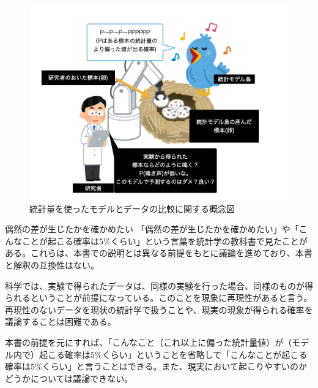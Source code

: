 \begin{figure}
    \begin{center}
        \includegraphics[bb=0 0 1024 768,width=15cm]{./image/01_/conceptual_diagram/conceptual_diagram.003.png}
        \caption{統計量を使ったモデルとデータの比較に関する概念図}
        \label{fig:conceptual_diagram_test}
    \end{center}
\end{figure}
    


\begin{SMbox}{偶然の差が生じたかを確かめたい}
    「偶然の差が生じたかを確かめたい」や「こんなことが起こる確率は$5\%$くらい」という言葉を統計学の教科書で見たことがある。これらは、本書での説明とは異なる前提をもとに議論を進めており、本書と解釈の互換性はない。
    
    科学では、実験で得られたデータは、同様の実験を行った場合、同様のものが得られるということが前提になっている。このことを現象に再現性があると言う。
    再現性のないデータを現状の統計学で扱うことや、現実の現象が得られる確率を議論することは困難である。

    本書の前提を元にすれば、「こんなこと（これ以上に偏った統計量値）が（モデル内で）起こる確率は$5\%$くらい」ということを省略して「こんなことが起こる確率は$5\%$くらい」と言うことはできる。また、現実において起こりやすいのかどうかについては議論できない。
\end{SMbox}


